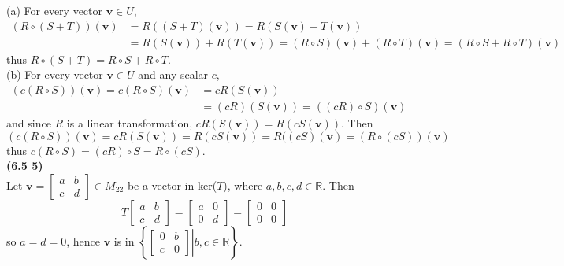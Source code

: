 (a) For every vector $\textbf{v} \in U$, \begin{align*}
	(R \circ (S + T))(\textbf{v}) &= R((S + T)(\textbf{v})) = R(S(\textbf{v}) + T(\textbf{v})) \\
	&= R(S(\textbf{v})) + R(T(\textbf{v})) = (R \circ S)(\textbf{v}) + (R \circ T)(\textbf{v}) = (R \circ S + R \circ T)(\textbf{v})
\end{align*} thus $R \circ (S + T) = R \circ S + R \circ T$. \\

(b) For every vector $\textbf{v} \in U$ and any scalar $c$, \begin{align*}
	(c(R \circ S))(\textbf{v}) = c(R \circ S)(\textbf{v}) &= cR(S(\textbf{v})) \\
	&= (cR)(S(\textbf{v})) = ((cR) \circ S)(\textbf{v})
\end{align*} and since $R$ is a linear transformation, $cR(S(\textbf{v})) = R(cS(\textbf{v}))$. Then \begin{equation*}
	(c(R \circ S))(\textbf{v}) = cR(S(\textbf{v})) = R(cS(\textbf{v})) = R((cS)(\textbf{v}) = (R \circ (cS))(\textbf{v})
\end{equation*} thus $c(R \circ S) = (cR) \circ S = R \circ (cS)$. \\

\textbf{(6.5 5)} \\
Let $\textbf{v} = \begin{bmatrix}
	a & b \\ c & d
\end{bmatrix} \in M_{22}$ be a vector in ker($T$), where $a, b, c, d \in \mathbb{R}$. Then \begin{equation*}
	T\begin{bmatrix}
		a & b \\ c & d
	\end{bmatrix} = \begin{bmatrix}
		a & 0 \\ 0 & d
	\end{bmatrix} = \begin{bmatrix}
		0 & 0 \\ 0 & 0
	\end{bmatrix}
\end{equation*} so $a = d = 0$, hence $\textbf{v}$ is in $\left\lbrace\left.\begin{bmatrix}
	0 & b \\ c & 0
\end{bmatrix} \right\vert b, c \in \mathbb{R} \right\rbrace$. \\

